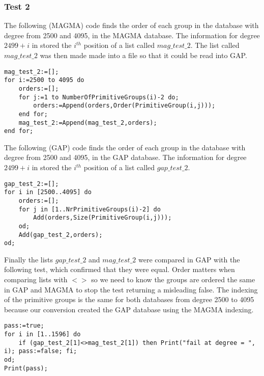 \documentclass[]{article}
\theoremstyle{definition}
\begin{document}
\subsubsection{Test 2}

The following (MAGMA) code finds the order of each group in the database with degree from 2500 and 4095, in the MAGMA database. The information for degree $2499+i$ in stored the $i^{th}$ position of a list called $mag\_test\_2$. The list called $mag\_test\_2$ was then made made into a file so that it could be read into GAP.
\begin{verbatim}
mag_test_2:=[];
for i:=2500 to 4095 do
	orders:=[]; 
	for j:=1 to NumberOfPrimitiveGroups(i)-2 do;
		orders:=Append(orders,Order(PrimitiveGroup(i,j)));
	end for;
	mag_test_2:=Append(mag_test_2,orders);
end for;
\end{verbatim}

The following (GAP) code finds the order of each group in the database with degree from 2500 and 4095, in the GAP database. The information for degree $2499+i$ in stored the $i^{th}$ position of a list called $gap\_test\_2$.
\begin{verbatim}
gap_test_2:=[];
for i in [2500..4095] do
	orders:=[];
	for j in [1..NrPrimitiveGroups(i)-2] do
		Add(orders,Size(PrimitiveGroup(i,j)));
	od;
	Add(gap_test_2,orders);
od;
\end{verbatim}

Finally the lists $gap\_test\_2$ and $mag\_test\_2$ were compared in GAP with the following test, which confirmed that they were equal. Order matters when comparing lists with $<>$ so we need to know the groups are ordered the same in GAP and MAGMA to stop the test returning a misleading false. The indexing of the primitive groups is the same for both databases from degree 2500 to 4095 because our conversion created the GAP database using the MAGMA indexing.
\begin{verbatim}
pass:=true;
for i in [1..1596] do
	if (gap_test_2[1]<>mag_test_2[1]) then Print("fail at degree = ", i); pass:=false; fi;
od;
Print(pass);
\end{verbatim}
\end{document}
